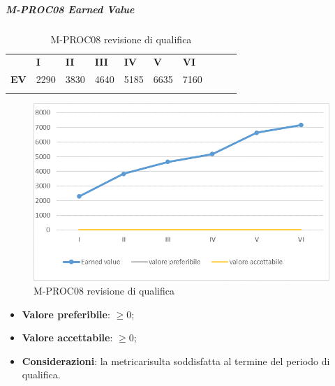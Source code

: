 \subparagraph{M-PROC08 Earned Value} \mbox{}
\begin{longtable}[H!] {						
		>{}p{50mm}  		
		>{}p{8mm}
		>{}p{8mm}		
		>{}p{8mm}		
		>{}p{8mm}		
		>{}p{8mm}		
		>{}p{8mm}
		>{}p{8mm}
		>{}p{8mm}
		>{}p{8mm}
	}
	\rowcolor{gray!50}
	\textbf{} & \textbf{I} & \textbf{II} & \textbf{III} & \textbf{IV} & \textbf{V} & \textbf{VI} \TBstrut \\ [2mm]
	\textbf{EV} & 2290 & 3830 & 4640 & 5185 & 6635 & 7160 \TBstrut \\ [2mm]
	\rowcolor{white}
	\caption{M-PROC08 revisione di qualifica}
\end{longtable}
\begin{figure}[H] 	
	\includegraphics[width=\linewidth]{./img/grafici/RQ8.png}	
	\caption{M-PROC08 revisione di qualifica}	
\end{figure}
\begin{itemize}
	\item \textbf{Valore preferibile}: $\ge0$;
	\item \textbf{Valore accettabile}: $\ge0$;
	\item \textbf{Considerazioni}: la metrica\glosp risulta soddisfatta al termine del periodo di qualifica.
\end{itemize}

